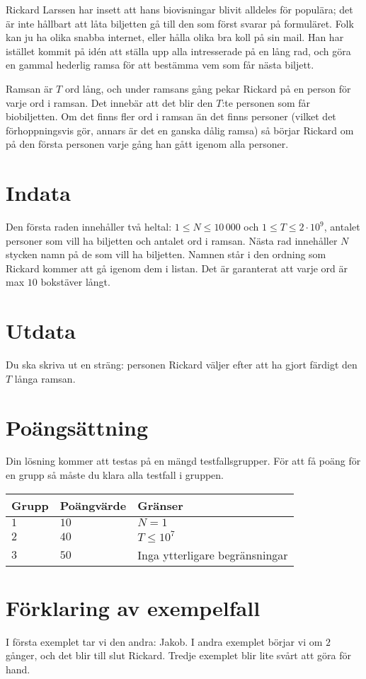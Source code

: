 Rickard Larssen har insett att hans biovisningar blivit alldeles för populära; det är inte hållbart att låta biljetten gå till den som först svarar på formuläret.
Folk kan ju ha olika snabba internet, eller hålla olika bra koll på sin mail. 
Han har istället kommit på idén att ställa upp alla intresserade på en lång rad, och göra en gammal hederlig ramsa för att bestämma vem som får nästa biljett. 

Ramsan är $T$ ord lång, och under ramsans gång pekar Rickard på en person för varje ord i ramsan. Det innebär att det blir den $T$:te personen som får biobiljetten. Om det finns fler ord i ramsan än det finns personer (vilket det förhoppningsvis gör, annars är det en ganska dålig ramsa) så börjar Rickard om på den första personen varje gång han gått igenom alla personer.

\section*{Indata}
Den första raden innehåller två heltal: $1 \leq N \leq 10\,000$ och $1\leq T \leq 2\cdot 10^9$, antalet personer som vill ha biljetten och antalet ord i ramsan.
Nästa rad innehåller $N$ stycken namn på de som vill ha biljetten. Namnen står i den ordning som Rickard kommer att gå igenom dem i listan.
Det är garanterat att varje ord är max $10$ bokstäver långt.

\section*{Utdata}
Du ska skriva ut en sträng: personen Rickard väljer efter att ha gjort färdigt den $T$ långa ramsan.

\section*{Poängsättning}
Din lösning kommer att testas på en mängd testfallsgrupper.
För att få poäng för en grupp så måste du klara alla testfall i gruppen.

\noindent
\begin{tabular}{| l | l | p{12cm} |}
  \hline
  Grupp & Poängvärde & Gränser \\ \hline
  $1$   & $10$       & $N=1$ \\ \hline
  $2$   & $40$       & $T \leq 10^7$ \\ \hline
  $3$   & $50$       & Inga ytterligare begränsningar \\ \hline
\end{tabular}

\section*{Förklaring av exempelfall}
I första exemplet tar vi den andra: Jakob.
I andra exemplet börjar vi om $2$ gånger, och det blir till slut Rickard.
Tredje exemplet blir lite svårt att göra för hand.
